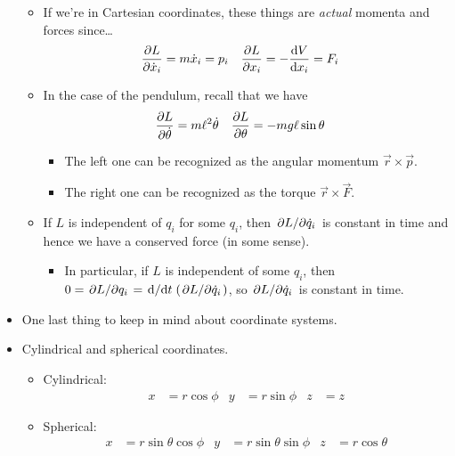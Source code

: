 \documentclass[../notes.tex]{subfiles}
\begin{document}
\begin{itemize}
    \begin{itemize}
        \item If we're in Cartesian coordinates, these things are \emph{actual} momenta and forces since\dots
        \begin{align*}
            \pdv{L}{\dot{x}_i} &= m\dot{x}_i
                = p_i&
            \pdv{L}{x_i} &= -\dv{V}{x_i}
                = F_i
        \end{align*}
        \item In the case of the pendulum, recall that we have
        \begin{align*}
            \pdv{L}{\dot{\theta}} &= m\ell^2\dot{\theta}&
            \pdv{L}{\theta} &= -mg\ell\sin\theta
        \end{align*}
        \begin{itemize}
            \item The left one can be recognized as the angular momentum $\vec{r}\times\vec{p}$.
            \item The right one can be recognized as the torque $\vec{r}\times\vec{F}$.
        \end{itemize}
        \item If $L$ is independent of $q_i$ for some $q_i$, then $\pdv*{L}{\dot{q}_i}$ is constant in time and hence we have a conserved force (in some sense).
        \begin{itemize}
            \item In particular, if $L$ is independent of some $q_i$, then $0=\pdv*{L}{q_i}=\dv*{t}(\pdv*{L}{\dot{q}_i})$, so $\pdv*{L}{\dot{q}_i}$ is constant in time.
        \end{itemize}
    \end{itemize}
    \item One last thing to keep in mind about coordinate systems.
    \item Cylindrical and spherical coordinates.
    \begin{itemize}
        \item Cylindrical:
        \begin{align*}
            x &= r\cos\phi&
            y &= r\sin\phi&
            z &= z
        \end{align*}
        \item Spherical:
        \begin{align*}
            x &= r\sin\theta\cos\phi&
            y &= r\sin\theta\sin\phi&
            z &= r\cos\theta
        \end{align*}

\end{itemize}
\end{itemize}
\end{document}
